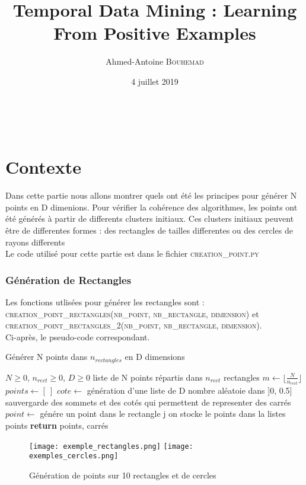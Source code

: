 \documentclass[a4paper,english,titlepage]{article}
\title{Temporal Data Mining : Learning From Positive Examples}
\author{Ahmed-Antoine \textsc{Bouhemad}}
\date{4 juillet 2019}
\institute{\textsc{VERIMAG}}
\begin{document}
  	
  \maketitlepage
  	

  
  \tableofcontents
  
  	\clearpage
 	\newpage
 	\mbox{~}
 	\clearpage
 	\newpage

	\part{Contexte}

	Dans cette partie nous allons montrer quels ont été les principes pour générer N points en D dimenions. Pour vérifier la cohérence des algorithmes, les points ont été générés à partir de differents clusters initiaux.
	Ces clusters initiaux peuvent être de differentes formes : des rectangles de tailles differentes ou des cercles de rayons differents \\
	Le code utilisé pour cette partie est dans le fichier \textsc{creation\_point.py}
	
	\section{Génération de Rectangles}
	Les fonctions utlisées pour générer les rectangles sont :  \textsc{creation\_point\_rectangles(nb\_point, nb\_rectangle, dimension)} et \textsc{creation\_point\_rectangles\_2(nb\_point, nb\_rectangle, dimension)}.\\
	Ci-après, le pseudo-code correspondant.

	\begin{algorithm}
		\caption{Générer N points dans $n_{rectangles}$ en D dimensions}
	\begin{algorithmic}
		\REQUIRE $N \geq 0 $, $n_{rect} \geq 0 $, $D \geq 0$
		\ENSURE liste de N points répartis dans $n_{rect}$ rectangles
		\STATE $m \leftarrow \lfloor\frac{N}{n_{rect}}\rfloor$
		\STATE $points \leftarrow [\ ]$
		\STATE $cote \leftarrow$ génération d'une liste de D nombre aléatoie dans ]0, 0.5]
		\STATE sauvergarde des sommets et des cotés qui permettent de representer des carrés
		\STATE $point \leftarrow $ génére un point dans le rectangle j
		\STATE on stocke le points dans la listes points
		\ENDFOR
		\ENDFOR
		\STATE \textbf{return} points, carrés
	\end{algorithmic}
\end{algorithm}
	\begin{center}
	\begin{figure}[h!]
		\texttt{[image: exemple\_rectangles.png]}
		\texttt{[image: exemples\_cercles.png]}
		\caption{Génération de points sur 10 rectangles et de cercles}
  \end{figure}
  \end{center}  
\end{document}
